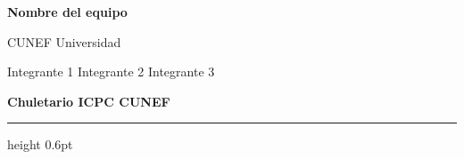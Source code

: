 \documentclass[8pt,a4paper,landscape]{extarticle}
\begin{document}
%
%
%
\begin{titlepage}
\begin{center}
  \vspace*{\fill}

  \vspace{1cm}

  {\Huge\bfseries Nombre del equipo}\par              %
  \vspace{0.8cm}
  {\Large CUNEF Universidad}\par                      %
  \vspace{0.5cm}
  {\large Integrante 1 \quad Integrante 2 \quad Integrante 3}\par   %
  \vspace{1.5cm}


  \vspace*{\fill}
\end{center}
\end{titlepage}
\clearpage

\begin{center}
  {\Large\bfseries Chuletario ICPC CUNEF}
\end{center}
\vspace{0.5ex}
{\color{cs@rule}\hrule height 0.6pt}
\vspace{0.8ex}
\end{document}
